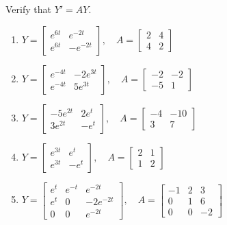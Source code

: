 \documentclass{ximera}
\begin{document}
\begin{problem}\label{exer:10.2.8}
 Verify that $Y' = AY$.

\begin{enumerate}
\item  %
 $Y = \begin{bmatrix} e^{6t} & e^{-2t}\\
e^{6t} & -e^{-2t}\end{bmatrix}, \quad A = \begin{bmatrix} 2 & 4\\ 4 &2\end{bmatrix}$

\item %
 $Y = \begin{bmatrix} e^{-4t}  &
-2e^{3t}\\ e^{-4t} & 5e^{3t}\end{bmatrix}, \quad A = \begin{bmatrix} -2 &
-2\\ -5 & 1\end{bmatrix}$

\item %
 $Y  = \begin{bmatrix} -5e^{2t} &
2e^t\\ 3e^{2t} & -e^t\end{bmatrix}, \quad A =
\begin{bmatrix} -4 & -10\\ 3 & 7\end{bmatrix}$

\item %
 $Y = \begin{bmatrix} e^{3t} &
e^t\\ e^{3t} & -e^t\end{bmatrix}, \quad A = \begin{bmatrix} 2 & 1\\ 1 & 2\end{bmatrix}$

\item %
 $Y = \left[\begin{array}{crr} e^t&e^{-t}&
e^{-2t}\\ e^t&0&-2e^{-2t}\\ 0&0&e^{-2t}\end{array}\right], \quad
A = \begin{bmatrix} -1 & 2 & 3\\ 0 & 1 &
6\\ 0 & 0 & -2\end{bmatrix}$


\end{enumerate}
\end{problem}
\end{document}
